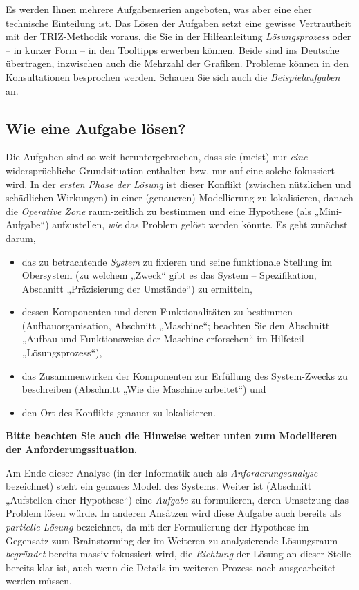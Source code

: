 \documentclass[11pt,a4paper]{article}
\begin{document}
Es werden Ihnen mehrere Aufgabenserien angeboten, was aber eine eher
technische Einteilung ist.  Das Lösen der Aufgaben setzt eine gewisse
Vertrautheit mit der TRIZ-Methodik voraus, die Sie in der Hilfeanleitung
\emph{Lösungsprozess} oder -- in kurzer Form -- in den Tooltipps erwerben
können.  Beide sind ins Deutsche übertragen, inzwischen auch die Mehrzahl der
Grafiken. Probleme können in den Konsultationen besprochen werden.  Schauen
Sie sich auch die \emph{Beispielaufgaben} an.

\subsection{Wie eine Aufgabe lösen?}

Die Aufgaben sind so weit heruntergebrochen, dass sie (meist) nur \emph{eine}
widersprüchliche Grundsituation enthalten bzw. nur auf eine solche fokussiert
wird.  In der \emph{ersten Phase der Lösung} ist dieser Konflikt (zwischen
nützlichen und schädlichen Wirkungen) in einer (genaueren) Modellierung zu
lokalisieren, danach die \emph{Operative Zone} raum-zeitlich zu bestimmen und
eine Hypothese (als „Mini-Aufgabe“) aufzustellen, \emph{wie} das Problem
gelöst werden könnte. Es geht zunächst darum,
\begin{itemize}
\item das zu betrachtende \emph{System} zu fixieren und seine funktionale
  Stellung im Obersystem (zu welchem „Zweck“ gibt es das System --
  Spezifikation, Abschnitt „Präzisierung der Umstände“) zu ermitteln,
\item dessen Komponenten und deren Funktionalitäten zu bestimmen
  (Aufbauorganisation, Abschnitt „Maschine“; beachten Sie den Abschnitt
  „Aufbau und Funktionsweise der Maschine erforschen“ im Hilfeteil
  „Lösungsprozess“),
\item das Zusammenwirken der Komponenten zur Erfüllung des System-Zwecks zu
  beschreiben (Abschnitt „Wie die Maschine arbeitet“) und 
\item den Ort des Konflikts genauer zu lokalisieren.  
\end{itemize}
\textbf{Bitte beachten Sie auch die Hinweise weiter unten zum Modellieren der
  Anforderungssituation.}

Am Ende dieser Analyse (in der Informatik auch als \emph{Anforderungsanalyse}
bezeichnet) steht ein genaues Modell des Systems.  Weiter ist (Abschnitt
„Aufstellen einer Hypothese“) eine \emph{Aufgabe} zu formulieren, deren
Umsetzung das Problem lösen würde. In anderen Ansätzen wird diese Aufgabe auch
bereits als \emph{partielle Lösung} bezeichnet, da mit der Formulierung der
Hypothese im Gegensatz zum Brainstorming der im Weiteren zu analysierende
Lösungsraum \emph{begründet} bereits massiv fokussiert wird, die
\emph{Richtung} der Lösung an dieser Stelle bereits klar ist, auch wenn die
Details im weiteren Prozess noch ausgearbeitet werden müssen.
\end{document}
